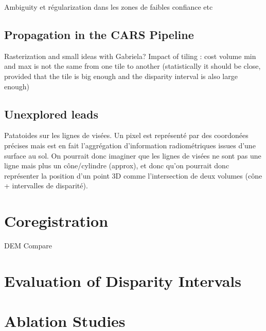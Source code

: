 Ambiguity et régularization dans les zones de faibles confiance etc


\subsection{Propagation in the CARS Pipeline}
Rasterization and small ideas with Gabriela?
Impact of tiling : cost volume min and max is not the same from one tile to another (statistically it should be close, provided that the tile is big enough and the disparity interval is also large enough)

\subsection{Unexplored leads}
Patatoides sur les lignes de visées. Un pixel est représenté par des coordonées précises mais est en fait l'aggrégation d'information radiométriques issues d'une surface au sol. On pourrait donc imaginer que les lignes de visées ne sont pas une ligne mais plus un cône/cylindre (approx), et donc qu'on pourrait donc représenter la position d'un point 3D comme l'intersection de deux volumes (cône + intervalles de disparité).   

\section{Coregistration}
DEM Compare 


\section{Evaluation of Disparity Intervals}
\section{Ablation Studies}
